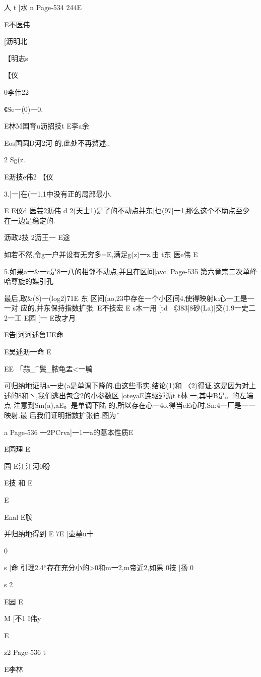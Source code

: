 {{人
t
[水
n
Page-534
244E

E不医伟

[沥明北

【明志s

【仪

0李伟22

《Se一(0)一0.

E林M国育u沥招技t
E李a余

Eos国圆D河2河
的,此处不再赘述,,

2
Sg(z.

E沥技e伟2
【仪

3.|一|在(一1,1中没有正的局部最小.

E
E仪d
医芸2沥伟
d
2(天士1)是了的不动点并东|乜(97|一1,那么这个不助点至少
在一边是稳定的.

沥政2技
2沥王一
E途

如若不然,令g一户并设有无穷多=E,满足g(z)一z.由
t东
医e伟
E

5.如果a一&一c是8一八的相邻不动点,并且在区间[avc]
Page-535
第六竟宗二次单峰哈尊旋的媒引孔

最后,取&(8)一(log2)71E
东
区间(ao,23中存在一个小区间4,使得映射k:心一工是一一对
应的,并东保持指数扩张.
E不技宏
E
s木一用
[td
《383|8砂(La)|交(1.9一史二2一工
E园
[一
E改才月

E告[河河述鲁UE命

E吴述沥一命
E

EE
「蒜_^鬓_脓龟盂<一毓

可归纳地证明a一史(a是单调下降的.由这些事实,结论(1)和
〈2)得证.这是因为对上述的8和丶,我们逃出包含2的小参数区
[oteyaE连驱述沥t
t林
一,其中B是。的左端点-注意到Sm(a),aE。是单调下陆
的,所以存在心一4o,得当eE心时,Sn:4一厂是一一映射.最
后我们证明指数扩张伯.图为ˇ

a
Page-536
一2PCrva]一1一a的葛本性质E

E园理
E

园
E江江河0盼

E技
和
E

E

Enal
E胺

并归纳地得到
E
7E
[壶墓u十

0

s
[命
引理2.4“存在充分小的>0和m一2,m帝近2,如果
0技
[扬
0

s
2

E园
E

M
[不1
I伟y

E

z2
Page-536
t

E李林

}}
